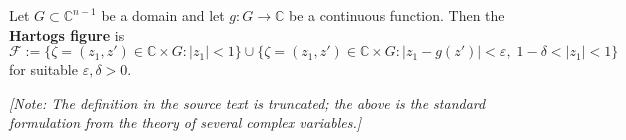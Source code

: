 Let $G \subset \mathbb{C}^{n-1}$ be a domain and let $g : G \to \mathbb{C}$ be a continuous function. Then the \textbf{Hartogs figure} is
$$\mathcal{F} := \{ \zeta = (z_1, z') \in \mathbb{C} \times G : |z_1| < 1 \} \cup \{ \zeta = (z_1, z') \in \mathbb{C} \times G : |z_1 - g(z')| < \varepsilon,\; 1-\delta < |z_1| < 1 \}$$
for suitable $\varepsilon, \delta > 0$.

\textit{[Note: The definition in the source text is truncated; the above is the standard formulation from the theory of several complex variables.]}
